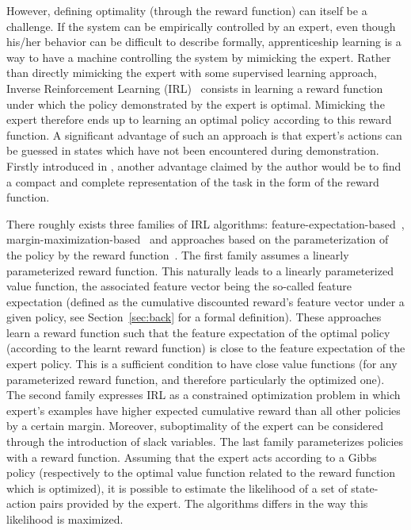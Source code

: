 \documentclass{jfpda2011}
\begin{document}
However, defining optimality (through the reward function) can
itself be a challenge. If the system can be empirically controlled
by an expert, even though his/her behavior can be difficult to
describe formally, apprenticeship learning is a way to have a
machine controlling the system by mimicking the expert. Rather than
directly mimicking the expert with some supervised learning
approach, Inverse Reinforcement Learning (IRL)~\citep{ng2000algorithms}
consists in learning a reward function under which the policy
demonstrated by the expert is optimal. Mimicking the expert therefore
ends up to learning an optimal policy according to this reward
function. A significant advantage of such an approach is that
expert's actions can be guessed in states which have not been
encountered during demonstration. Firstly introduced in \citep{russell1998learning}, another advantage claimed by the author would be to
find a compact and complete representation of the task in the form
of the reward function.

There roughly exists three families of IRL algorithms:
feature-expectation-based~\citep{abbeel2004apprenticeship,syed2008apprenticeship,syed2008game,ziebart2008maximum},
margin-maximization-based~\citep{ratliff2006maximum,ratliff2007imitation,ratliff2007boosting,kolter2008hierarchical}
and approaches based on the parameterization of the policy by the
reward function~\citep{ramachandran2007bayesian,neu2007apprenticeship}. The first family
assumes a linearly parameterized reward function. This naturally
leads to a linearly parameterized value function, the associated
feature vector being the so-called feature expectation (defined as
the cumulative discounted reward's feature vector under a given
policy, see Section~\ref{sec:back} for a formal definition).
These approaches learn a reward function such that the feature
expectation of the optimal policy (according to the learnt reward
function) is close to the feature expectation of the expert policy.
This is a sufficient condition to have close value functions (for any parameterized reward function, and therefore particularly the optimized one). The
second family expresses IRL as a constrained optimization problem in
which expert's examples have higher expected cumulative reward than all other
policies by a certain margin. Moreover, suboptimality of the expert
can be considered through the introduction of slack variables. The
last family parameterizes policies with a reward function. Assuming
that the expert acts according to a Gibbs policy (respectively to
the optimal value function related to the reward function which is
optimized), it is possible to estimate the likelihood of a set of
state-action pairs provided by the expert. The algorithms differs in
the way this likelihood is maximized.
\end{document}

